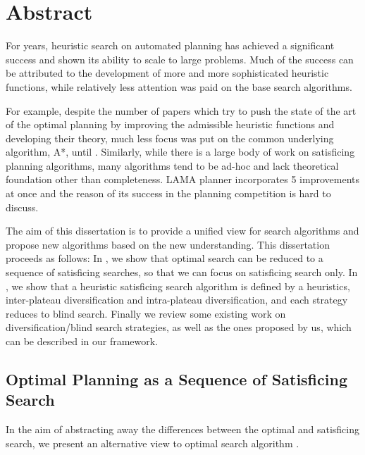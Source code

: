\chapter{Abstract}

For years, heuristic search on automated planning has achieved a significant success and shown its
ability to scale to large problems. Much of the success can be attributed to the development of more
and more sophisticated heuristic functions, while relatively less attention was paid on the 
base search algorithms.

For example, despite the number of papers which try to push the state of the art of the
optimal planning by improving the admissible heuristic functions and developing their theory, much
less focus was put on the common underlying algorithm, A*, until \cite{Asai2016}.  Similarly, while
there is a large body of work on satisficing planning algorithms, many algorithms tend to be ad-hoc
and lack theoretical foundation other than completeness. \sota LAMA planner
\cite{richter2010lama} incorporates 5 improvements at once and the reason of its success in the
planning competition is hard to discuss.

The aim of this dissertation is to provide a unified view for search algorithms and propose new algorithms
based on the new understanding.
This dissertation proceeds as follows:
In , we show that optimal search can be reduced to a sequence of satisficing
searches, so that we can focus on satisficing search only. In , we show that a
heuristic satisficing search algorithm is defined by a heuristics, inter-plateau diversification
and intra-plateau diversification, and each strategy reduces to blind search. 
Finally we review some existing work on diversification/blind search strategies,
as well as the ones proposed by us, which can be described in our framework.

\section{Optimal Planning as a Sequence of Satisficing Search}

\label{sec:opt}

In the aim of abstracting away the differences between the optimal and satisficing search,
we present an alternative view to optimal search algorithm \astar \cite{asai2017tie}.
 
